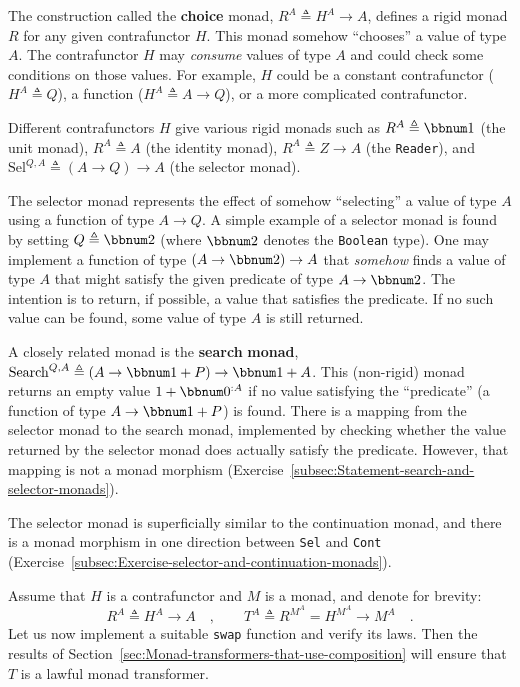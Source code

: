 The construction called the \textbf{choice}
monad, $R^{A}\triangleq H^{A}\rightarrow A$, defines a rigid monad
$R$ for any given contrafunctor $H$. This monad somehow \textsf{``}chooses\textsf{''}
a value of type $A$. The contrafunctor $H$ may \emph{consume} values
of type $A$ and could check some conditions on those values. For
example, $H$ could be a constant contrafunctor ($H^{A}\triangleq Q$),
a function ($H^{A}\triangleq A\rightarrow Q$), or a more complicated
contrafunctor.

Different contrafunctors $H$ give various rigid monads such as $R^{A}\triangleq\bbnum 1$
(the unit monad), $R^{A}\triangleq A$ (the identity monad), $R^{A}\triangleq Z\rightarrow A$
(the \lstinline!Reader!), and $\text{Sel}^{Q,A}\triangleq\left(A\rightarrow Q\right)\rightarrow A$
(the selector monad). 

The selector monad represents the effect of somehow \textsf{``}selecting\textsf{''}
a value of type $A$ using a function of type $A\rightarrow Q$. A
simple example of a selector monad is found by setting $Q\triangleq\bbnum 2$
(where $\bbnum 2$ denotes the \lstinline!Boolean! type). One may
implement a function of type $\left(A\rightarrow\bbnum 2\right)\rightarrow A$
that \emph{somehow} finds a value of type $A$ that might satisfy
the given predicate of type $A\rightarrow\bbnum 2$. The intention
is to return, if possible, a value that satisfies the predicate. If
no such value can be found, some value of type $A$ is still returned.

A closely related monad is the \textbf{search} \textbf{monad},
$\text{Search}^{Q,A}\triangleq\left(A\rightarrow\bbnum 1+P\right)\rightarrow\bbnum 1+A$.
This (non-rigid) monad returns an empty value $1+\bbnum 0^{:A}$ if
no value satisfying the \textsf{``}predicate\textsf{''} (a function of type $A\rightarrow\bbnum 1+P$)
is found. There is a mapping from the selector monad to the search
monad, implemented by checking whether the value returned by the selector
monad does actually satisfy the predicate. However, that mapping is
not a monad morphism (Exercise~\ref{subsec:Statement-search-and-selector-monads}).

The selector monad is superficially similar to the continuation monad,
and there is a monad morphism in one direction between \lstinline!Sel!
and \lstinline!Cont! (Exercise~\ref{subsec:Exercise-selector-and-continuation-monads}).

Assume that $H$ is a contrafunctor and $M$ is a monad, and denote
for brevity:
\[
R^{A}\triangleq H^{A}\rightarrow A\quad,\quad\quad T^{A}\triangleq R^{M^{A}}=H^{M^{A}}\rightarrow M^{A}\quad.
\]
Let us now implement a suitable \lstinline!swap! function and verify
its laws. Then the results of Section~\ref{sec:Monad-transformers-that-use-composition}
will ensure that $T$ is a lawful monad transformer. 

